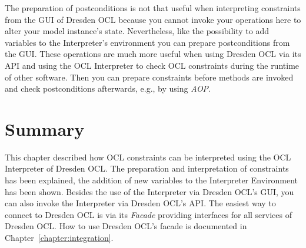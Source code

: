 The preparation of postconditions is not that useful when interpreting 
constraints from the GUI of Dresden OCL because you cannot invoke your 
operations here to alter your model instance's state. Nevertheless, like the 
possibility to add variables to the Interpreter's environment you can prepare 
postconditions from the GUI. These operations are much more useful when using 
Dresden OCL via its API and using the \acs{OCL} Interpreter to check \acs{OCL} 
constraints during the runtime of other software. Then you can prepare
constraints before methods are invoked and check postconditions afterwards, 
e.g., by using \emph{\acf{AOP}}.



\section{Summary}
  
This chapter described how \acs{OCL} constraints can be interpreted using the 
\acs{OCL} Interpreter of Dresden OCL. The preparation and interpretation of 
constraints has been explained, the addition of new variables to the 
Interpreter Environment has been shown. Besides the use of the Interpreter via 
Dresden OCL's GUI, you can also invoke the Interpreter via Dresden OCL's 
\acs{API}. The easiest way to connect to Dresden OCL is via its \emph{Facade} 
providing interfaces for all services of Dresden OCL. How to use Dresden OCL's 
facade is documented in Chapter~\ref{chapter:integration}.

